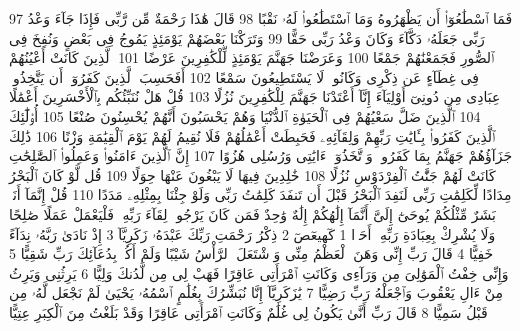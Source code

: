 {\tiny\colorbox{cl_aya}{97}} فَمَا ٱسْطَٰعُوٓا۟ أَن يَظْهَرُوهُ وَمَا ٱسْتَطَٰعُوا۟ لَهُۥ نَقْبًا
{\tiny\colorbox{cl_aya}{98}} قَالَ هَٰذَا رَحْمَةٌ مِّن رَّبِّى فَإِذَا جَآءَ وَعْدُ رَبِّى جَعَلَهُۥ دَكَّآءَ وَكَانَ وَعْدُ رَبِّى حَقًّا
{\tiny\colorbox{cl_aya}{99}} وَتَرَكْنَا بَعْضَهُمْ يَوْمَئِذٍ يَمُوجُ فِى بَعْضٍ وَنُفِخَ فِى ٱلصُّورِ فَجَمَعْنَٰهُمْ جَمْعًا
{\tiny\colorbox{cl_aya}{100}} وَعَرَضْنَا جَهَنَّمَ يَوْمَئِذٍ لِّلْكَٰفِرِينَ عَرْضًا
{\tiny\colorbox{cl_aya}{101}} ٱلَّذِينَ كَانَتْ أَعْيُنُهُمْ فِى غِطَآءٍ عَن ذِكْرِى وَكَانُوا۟ لَا يَسْتَطِيعُونَ سَمْعًا
{\tiny\colorbox{cl_aya}{102}} أَفَحَسِبَ ٱلَّذِينَ كَفَرُوٓا۟ أَن يَتَّخِذُوا۟ عِبَادِى مِن دُونِىٓ أَوْلِيَآءَ إِنَّآ أَعْتَدْنَا جَهَنَّمَ لِلْكَٰفِرِينَ نُزُلًا
{\tiny\colorbox{cl_aya}{103}} قُلْ هَلْ نُنَبِّئُكُم بِٱلْأَخْسَرِينَ أَعْمَٰلًا
{\tiny\colorbox{cl_aya}{104}} ٱلَّذِينَ ضَلَّ سَعْيُهُمْ فِى ٱلْحَيَوٰةِ ٱلدُّنْيَا وَهُمْ يَحْسَبُونَ أَنَّهُمْ يُحْسِنُونَ صُنْعًا
{\tiny\colorbox{cl_aya}{105}} أُو۟لَٰٓئِكَ ٱلَّذِينَ كَفَرُوا۟ بِـَٔايَٰتِ رَبِّهِمْ وَلِقَآئِهِۦ فَحَبِطَتْ أَعْمَٰلُهُمْ فَلَا نُقِيمُ لَهُمْ يَوْمَ ٱلْقِيَٰمَةِ وَزْنًا
{\tiny\colorbox{cl_aya}{106}} ذَٰلِكَ جَزَآؤُهُمْ جَهَنَّمُ بِمَا كَفَرُوا۟ وَٱتَّخَذُوٓا۟ ءَايَٰتِى وَرُسُلِى هُزُوًا
{\tiny\colorbox{cl_aya}{107}} إِنَّ ٱلَّذِينَ ءَامَنُوا۟ وَعَمِلُوا۟ ٱلصَّٰلِحَٰتِ كَانَتْ لَهُمْ جَنَّٰتُ ٱلْفِرْدَوْسِ نُزُلًا
{\tiny\colorbox{cl_aya}{108}} خَٰلِدِينَ فِيهَا لَا يَبْغُونَ عَنْهَا حِوَلًا
{\tiny\colorbox{cl_aya}{109}} قُل لَّوْ كَانَ ٱلْبَحْرُ مِدَادًا لِّكَلِمَٰتِ رَبِّى لَنَفِدَ ٱلْبَحْرُ قَبْلَ أَن تَنفَدَ كَلِمَٰتُ رَبِّى وَلَوْ جِئْنَا بِمِثْلِهِۦ مَدَدًا
{\tiny\colorbox{cl_aya}{110}} قُلْ إِنَّمَآ أَنَا۠ بَشَرٌ مِّثْلُكُمْ يُوحَىٰٓ إِلَىَّ أَنَّمَآ إِلَٰهُكُمْ إِلَٰهٌ وَٰحِدٌ فَمَن كَانَ يَرْجُوا۟ لِقَآءَ رَبِّهِۦ فَلْيَعْمَلْ عَمَلًا صَٰلِحًا وَلَا يُشْرِكْ بِعِبَادَةِ رَبِّهِۦٓ أَحَدًۢا
{\tiny\colorbox{cl_aya}{1}} كٓهيعٓصٓ
{\tiny\colorbox{cl_aya}{2}} ذِكْرُ رَحْمَتِ رَبِّكَ عَبْدَهُۥ زَكَرِيَّآ
{\tiny\colorbox{cl_aya}{3}} إِذْ نَادَىٰ رَبَّهُۥ نِدَآءً خَفِيًّا
{\tiny\colorbox{cl_aya}{4}} قَالَ رَبِّ إِنِّى وَهَنَ ٱلْعَظْمُ مِنِّى وَٱشْتَعَلَ ٱلرَّأْسُ شَيْبًا وَلَمْ أَكُنۢ بِدُعَآئِكَ رَبِّ شَقِيًّا
{\tiny\colorbox{cl_aya}{5}} وَإِنِّى خِفْتُ ٱلْمَوَٰلِىَ مِن وَرَآءِى وَكَانَتِ ٱمْرَأَتِى عَاقِرًا فَهَبْ لِى مِن لَّدُنكَ وَلِيًّا
{\tiny\colorbox{cl_aya}{6}} يَرِثُنِى وَيَرِثُ مِنْ ءَالِ يَعْقُوبَ وَٱجْعَلْهُ رَبِّ رَضِيًّا
{\tiny\colorbox{cl_aya}{7}} يَٰزَكَرِيَّآ إِنَّا نُبَشِّرُكَ بِغُلَٰمٍ ٱسْمُهُۥ يَحْيَىٰ لَمْ نَجْعَل لَّهُۥ مِن قَبْلُ سَمِيًّا
{\tiny\colorbox{cl_aya}{8}} قَالَ رَبِّ أَنَّىٰ يَكُونُ لِى غُلَٰمٌ وَكَانَتِ ٱمْرَأَتِى عَاقِرًا وَقَدْ بَلَغْتُ مِنَ ٱلْكِبَرِ عِتِيًّا
